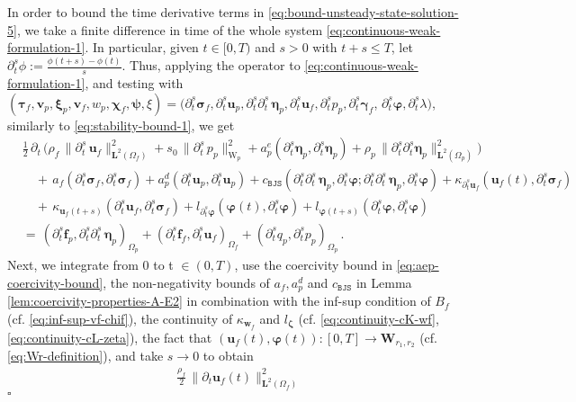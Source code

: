 \documentclass[11pt]{article}
\numberwithin{equation}{section}
\newcommand{\ds}{\displaystyle}
\newcommand{\bgamma}{{\boldsymbol\gamma}}
\newcommand{\bbeta}{{\boldsymbol\eta}}
\newcommand{\bsi}{{\boldsymbol\sigma}}
\newcommand{\bvarphi}{{\boldsymbol\varphi}}
\newcommand{\bpsi}{{\boldsymbol\psi}}
\newcommand{\btau}{{\boldsymbol\tau}}
\newcommand{\bzeta}{{\boldsymbol\zeta}}
\newcommand{\bchi}{{\boldsymbol\chi}}
\newcommand{\bxi}{{\boldsymbol\xi}}
\newcommand{\bv}{{\mathbf{v}}}
\newcommand{\bw}{{\mathbf{w}}}
\newcommand{\f}{\mathbf{f}}
\newcommand{\bu}{\mathbf{u}}
\newcommand{\0}{{\mathbf{0}}}
\def\bW{\mathbf{W}}
\newcommand{\bL}{\mathbf{L}}
\def\W{\mathrm{W}}
\def\BJS{\mathtt{BJS}}
\newenvironment{proof}{\noindent{\it Proof.}}{\hfill$\square$}
\numberwithin{equation}{section}
\begin{document}
\begin{proof}
\noindent In order to bound the time derivative terms in \eqref{eq:bound-unsteady-state-solution-5}, we take a finite difference in time of the whole system \eqref{eq:continuous-weak-formulation-1}. 
In particular, given $t \in [0,T)$ and $s > 0$ with $t+s \le T$, let $\partial_t^s\phi := \frac{\phi(t+s) - \phi(t)}{s}$. 
Thus, applying the operator to \eqref{eq:continuous-weak-formulation-1}, and testing with
$(\btau_f, \bv_p, \bxi_p, \bv_f, w_p, \bchi_f, \bpsi, \xi) = (\partial_t^s\bsi_f, \partial_t^s\bu_p, \partial_t^s\partial_t^s\,\bbeta_p, \partial_t^s\bu_f, \partial_t^s p_p, \partial_t^s\bgamma_f$, $\partial_t^s\bvarphi, \partial_t^s\lambda)$, similarly to \eqref{eq:stability-bound-1}, we get 
\begin{align}
& \frac{1}{2}\,\partial_t\,\Big( \rho_f\,\|\partial_t^s\,\bu_f\|^2_{\bL^2(\Omega_f)} 
+ s_0\,\|\partial_t^s\,p_p\|^2_{\W_p} 
+ a^e_p(\partial_t^s\bbeta_p, \partial_t^s\bbeta_p) 
+ \rho_p\,\|\partial_t^s\partial_t^s\bbeta_p\|^2_{\bL^2(\Omega_p)}\Big) 
\nonumber \\
&\quad +\, a_f(\partial_t^s\bsi_f, \partial_t^s\bsi_f)
+ a^d_p(\partial_t^s\bu_p,\partial_t^s\bu_p) 
+ c_{\BJS}(\partial_t^s\partial_t^s\,\bbeta_p,\partial_t^s \bvarphi;\partial_t^s\partial_t^s\,\bbeta_p, \partial_t^s\bvarphi) 
+ \kappa_{\partial_t^s\bu_f}(\bu_f(t),\partial_t^s\bsi_f)  
\nonumber \\
&\quad +\, \kappa_{\bu_f(t+s)}(\partial_t^s\bu_f,\partial_t^s\bsi_f)
+ l_{\partial_t^s\bvarphi}(\bvarphi(t),\partial_t^s\bvarphi) 
+ l_{\bvarphi(t+s)}(\partial_t^s\bvarphi,\partial_t^s\bvarphi)
\nonumber \\
& =\, (\partial_t^s\f_p,\partial_t^s\partial_t^s\,\bbeta_p)_{\Omega_p} 
+ (\partial_t^s\f_f,\partial_t^s\bu_f)_{\Omega_f} 
+ (\partial_t^s q_p,\partial_t^s p_p)_{\Omega_p}\,.
\label{eq:stability-bound-7}
\end{align}
Next, we integrate from 0 to t $\in (0,T)$, use the coercivity bound in \eqref{eq:aep-coercivity-bound}, the non-negativity bounds of $a_f, a^d_p$ and $c_{\BJS}$ in Lemma \ref{lem:coercivity-properties-A-E2} in combination with the inf-sup condition of $B_f$ (cf. \eqref{eq:inf-sup-vf-chif}), the continuity of  $\kappa_{\bw_f}$ and $l_{\bzeta}$ (cf. \eqref{eq:continuity-cK-wf}, \eqref{eq:continuity-cL-zeta}), the fact that $(\bu_f(t),\bvarphi(t)):[0,T]\to \bW_{r_1,r_2}$ (cf. \eqref{eq:Wr-definition}), and take $s\to 0$ to obtain
\begin{align}\label{eq:bound-unsteady-state-solution-8}
&\ds \frac{\rho_f}{2}\,\|\partial_t \bu_f(t)\|^2_{\bL^2(\Omega_f)} 

\end{align}
\end{proof}
\end{document}
